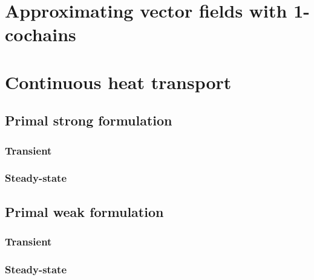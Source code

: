 \documentclass{article}
\theoremstyle{definition}
\begin{document}
\section{Approximating vector fields with 1-cochains}
\label{section:approximating_vector_fields_with_1_cochains}













\section{Continuous heat transport}
\label{section:continuous_diffusion}


\subsection{Primal strong formulation}
\subsubsection{Transient}

\subsubsection{Steady-state}

\subsection{Primal weak formulation}
\subsubsection{Transient}


\subsubsection{Steady-state}

\end{document}

